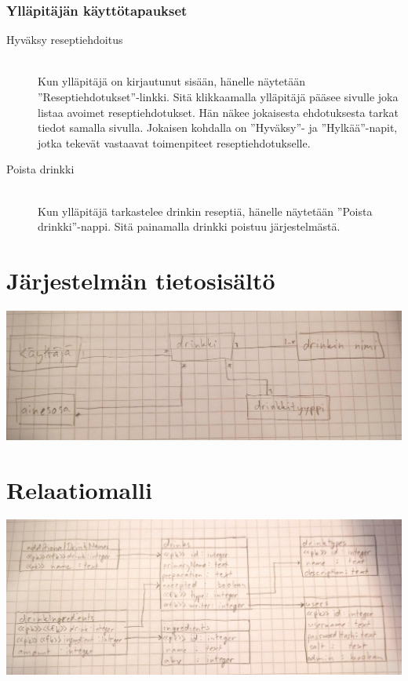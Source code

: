 \documentclass[a4paper]{article}
\begin{document}
\subsubsection{Ylläpitäjän käyttötapaukset}
\begin{description}
  \item[Hyväksy reseptiehdoitus] \hfill \\ Kun ylläpitäjä on kirjautunut sisään, hänelle näytetään ''Reseptiehdotukset''-linkki. Sitä klikkaamalla ylläpitäjä pääsee sivulle joka listaa avoimet reseptiehdotukset. Hän näkee jokaisesta ehdotuksesta tarkat tiedot samalla sivulla. Jokaisen kohdalla on ''Hyväksy''- ja ''Hylkää''-napit, jotka tekevät vastaavat toimenpiteet reseptiehdotukselle.
  \item[Poista drinkki] \hfill \\ Kun ylläpitäjä tarkastelee drinkin reseptiä, hänelle näytetään ''Poista drinkki''-nappi. Sitä painamalla drinkki poistuu järjestelmästä.
\end{description}

\section{Järjestelmän tietosisältö}
\includegraphics[width=\textwidth]{tietosisalto}

\section{Relaatiomalli}
\includegraphics[width=\textwidth]{relation-diagram}
\end{document}
